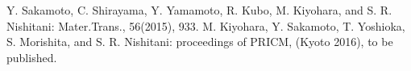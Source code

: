 \documentclass[12pt,a4paper,dvipdfmx]{jsarticle}
\begin{document}
{\small\setlength\baselineskip{10pt}	%
\begin{thebibliography}{9}
Y. Sakamoto, C. Shirayama, Y. Yamamoto, R. Kubo, M. Kiyohara, and S. R. Nishitani: Mater.Trans., 56(2015), 933.
 M. Kiyohara, Y. Sakamoto, T. Yoshioka, S. Morishita, and S. R. Nishitani: proceedings of PRICM, (Kyoto 2016), to be published.
\end{thebibliography}
}
\end{document}
